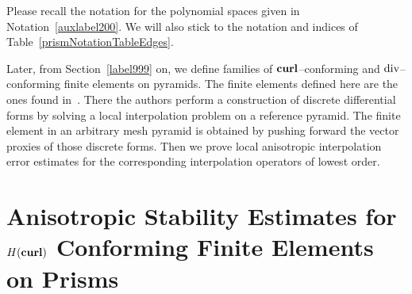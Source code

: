 Please recall 
the notation for the polynomial spaces given in Notation~\ref{auxlabel200}. We 
will also stick to the notation and indices of 
Table~\ref{prismNotationTableEdges}.

Later, from Section~\ref{label999} on, we define families of
$\textbf{curl}$--conforming and $\operatorname{\textrm{div}}$--conforming finite elements on pyramids.
The finite elements defined here 
are the ones found in~\cite{gh99}. There the authors
perform a
construction of discrete differential
forms by solving a local interpolation problem on a reference pyramid. The
finite element in an arbitrary mesh pyramid is obtained by pushing forward
the vector proxies of those discrete forms.
Then we prove local anisotropic interpolation error estimates for the
corresponding interpolation operators of lowest order.

\section{An\-iso\-tropic Stability Estimates for $H(\textbf{curl})$ Conforming Finite
Elements on Prisms}
\label{stab_edge_prism}




